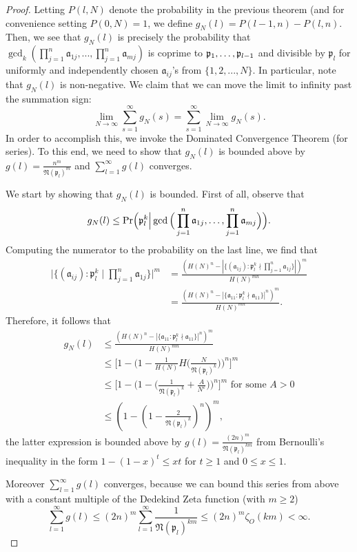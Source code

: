 \documentclass[12pt]{amsart}
\theoremstyle{definition}
\newcommand{\f}[1]{\mathfrak{#1}}
\begin{document}
\begin{proof}
Letting $P(l, N)$ denote the probability in the previous theorem (and for convenience setting $P(0, N) = 1$, we define $g_N(l) = P(l-1, n) - P(l, n)$. Then, we see that $g_N(l)$ is precisely the probability that $\gcd_k(\prod_{j=1}^n \f{a}_{1j}, ... , \prod_{j=1}^n \f{a}_{mj})$ is coprime to $\f{p}_1, \mathellipsis, \f{p}_{l-1}$ and divisible by $\f{p}_l$ for uniformly and independently chosen $\f{a}_{ij}$'s from $\{1, 2, ..., N\}$. In particular, note that $g_N(l)$ is non-negative. We claim that we can move the limit to infinity past the summation sign:
$$\lim_{N \to \infty} \sum_{s=1}^{\infty} g_N(s) = \sum_{s=1}^{\infty} \lim_{N \to \infty} g_N(s).$$
In order to accomplish this, we invoke the Dominated Convergence Theorem (for series). To this end, we need to show that $g_N(l)$ is bounded above by $g(l) = \frac{n^m}{\f{N}(\f{p}_{l})^{m}}$ and $\sum_{l=1}^{\infty} g(l)$ converges.

We start by showing that $g_N(l)$ is bounded. First of all, observe that
$$g_N(l) \leq \text{Pr}\Big(\f{p}_l^k \Big| \gcd\Big(\prod_{j=1}^n \f{a}_{1j}, \mathellipsis, \prod_{j=1}^n \f{a}_{mj}\Big)\Big).$$
Computing the numerator to the probability on the last line, we find that
\begin{align*} 
	\Big|\{(\f{a}_{ij}) : \f{p}_l^k \mid \prod_{j=1}^n \f{a}_{1j}\}\Big|^m &= \frac{(H(N)^n - |\{(\f{a}_{1j}) : \f{p}_l^k \nmid \prod_{j=1}^n \f{a}_{1j}\}|)^m}{H(N)^{mn}}\\
	&= \frac{(H(N)^n - |\{\f{a}_{11} : \f{p}_l^k \nmid \f{a}_{11}\}|^n)^m}{H(N)^{mn}}. \end{align*}
Therefore, it follows that
\begin{align*} 
	g_N(l) &\leq \frac{(H(N)^n - |\{\f{a}_{11} : \f{p}_l^k \nmid \f{a}_{11}\}|^n)^m}{H(N)^{mn}}\\
	&\leq \Big[1 - \Big(1 - \frac{1}{H(N)}  H\Big(\frac{N}{\f{N}(\f{p}_l)^k}\Big)\Big)^n\Big]^m\\
	&\leq \Big[1 - \Big(1 - \Big(\frac{1}{\f{N}(\f{p}_l)^k}+\frac{A}{N^{\varepsilon}}\Big)\Big)^n\Big]^m \text{ for some } A>0\\
	&\leq (1-(1-\frac{2}{\f{N}(\f{p}_l)^k})^n)^m,
\end{align*}
the latter expression is bounded above by $g(l)=\frac{(2n)^m}{\f{N}(\f{p}_l)^{km}}$ from Bernoulli's inequality in the form $1-(1-x)^t\leq xt$ for $t\geq 1$ and $0\leq x \leq 1$.

 Moreover $\sum_{l=1}^{\infty} g(l)$ converges, because we can bound this series from above with a constant multiple of the Dedekind Zeta function (with $m\geq 2$) $$ \sum_{l=1}^{\infty}g(l)\leq(2n)^m\sum_{l=1}^{\infty}\frac{1}{\f{N}(\f{p}_l)^{km}}\leq (2n)^m\zeta_O(km)< \infty.$$


\end{proof}
\end{document}
